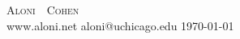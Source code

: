 \documentclass[11pt]{article}
\begin{document}
\begin{center}
{\huge\textsc{Aloni\ \ Cohen}}\\
\vspace{1em}
{www.aloni.net} \quad {\Large $\cdot$} \quad
{aloni@uchicago.edu} \quad {\Large $\cdot$} \quad \today\\
\end{center}









\end{document}
